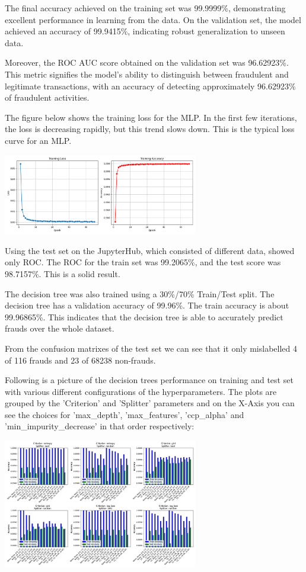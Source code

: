 \documentclass[a4paper, 10pt, conference]{ieeeconf}      %
\begin{document}
The final accuracy achieved on the training set was 99.9999\%, demonstrating excellent performance in learning from the data. On the validation set, the model achieved an accuracy of 99.9415\%, indicating robust generalization to unseen data.

Moreover, the ROC AUC score obtained on the validation set was 96.62923\%. This metric signifies the model's ability to distinguish between fraudulent and legitimate transactions, with an accuracy of detecting approximately 96.62923\% of fraudulent activities.

The figure below shows the training loss for the MLP. In the first few iterations, the loss is decreasing rapidly, but this trend slows down. This is the typical loss curve for an MLP. 
\begin{center}
  \includegraphics[width=8.5cm]{../data/mlp-plot.png} \label{mlp-plot}
\end{center}

Using the test set on the JupyterHub, which consisted of different data, showed only ROC. The ROC for the train set was 99.2065\%, and the test score was 98.7157\%. This is a solid result.

The decision tree was also trained using a 30\%/70\% Train/Test split.
The decision tree has a validation accuracy of 99.96\%. The train accuracy is about 99.96865\%. This indicates that the decision tree is able to accurately predict frauds over the whole dataset.

From the confusion matrixes of the test set we can see that it only mislabelled 4 of 116 frauds and 23 of 68238 non-frauds.

Following is a picture of the decision trees performance on training and test set with various different configurations of the hyperparameters. The plots are grouped by the 'Criterion' and 'Splitter' parameters and on the X-Axis you can see the choices for 'max\_depth', 'max\_features', 'ccp\_alpha' and 'min\_impurity\_decrease' in that order respectively:

\begin{center}
  \includegraphics[width=8.5cm]{../data/accuracy_plot.png} \label{accuracy-plot}
\end{center}
\end{document}
